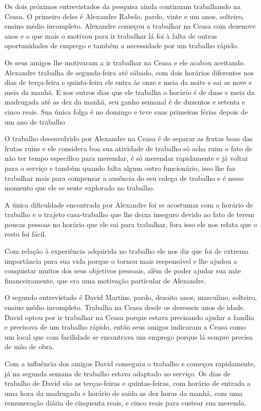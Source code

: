  Os dois próximos entrevistados da pesquisa ainda continuam trabalhando na Ceasa. O primeiro deles é Alexandre
 Rabelo, pardo, vinte e um anos, solteiro, ensino médio incompleto. Alexandre começou a trabalhar na Ceasa com 
 dezenove anos e o que mais o motivou para ir trabalhar lá foi à falta de outras oportunidades de emprego e 
 também a necessidade por um trabalho rápido. 
 
 Os seus amigos lhe motivaram a ir trabalhar na Ceasa e ele acabou 
 aceitando. Alexandre trabalha de segunda-feira até sábado, com dois horários diferentes nos dias de terça-feira
 e quinta-feira ele entra às onze e meia da noite e sai as nove e meia da manhã. E nos outros dias que ele trabalha 
 o horário é de duas e meia da madrugada até as dez da manhã, seu ganho semanal é de duzentos e setenta e cinco reais. 
 Sua única folga é no domingo e teve suas primeiras férias depois de um ano de trabalho

O trabalho desenvolvido por Alexandre na Ceasa é de separar as frutas boas das 
frutas ruins e ele considera boa sua atividade de trabalho só acha ruim o fato 
de não ter tempo específico para merendar, é só merendar rapidamente e já voltar 
para o serviço e também quando falta algum outro funcionário, isso lhe faz 
trabalhar mais para compensar a ausência do seu colega de trabalho e é nesse 
momento que ele se sente explorado no trabalho. 

A única dificuldade encontrada 
por Alexandre foi se acostumar com o horário de trabalho e o trajeto 
casa-trabalho que lhe deixa inseguro devido ao fato de terem poucas pessoas no 
horário que ele sai para trabalhar, fora isso ele nos relata que o resto foi 
fácil.

 Com relação à experiência adquirida no trabalho ele nos diz que foi de extrema 
importância para sua vida porque o tornou mais responsável e lhe ajudou a 
conquistar muitos dos seus objetivos pessoais, além de poder ajudar sua mãe 
financeiramente, que era uma motivação particular de Alexandre.

 O segundo entrevistado é David Martins, pardo, dezoito anos, masculino, 
solteiro, ensino médio incompleto. Trabalha na Ceasa desde os dezesseis anos de 
idade. David optou por ir trabalhar na Ceasa porque estava precisando ajudar a 
família e precisava de um trabalho rápido, então seus amigos indicaram a Ceasa 
como um local que com facilidade se encontrava um emprego porque lá sempre 
precisa de mão de obra. 

Com a influência dos amigos David conseguiu o trabalho e 
começou rapidamente, já na segunda semana de trabalho estava adaptado ao 
serviço. Os dias de trabalho de David são as terças-feiras e quintas-feiras, com 
horário de entrada a uma hora da madrugada e horário de saída as dez horas da 
manhã, com uma remuneração diária de cinquenta reais, e cinco reais para custear 
sua merenda.


